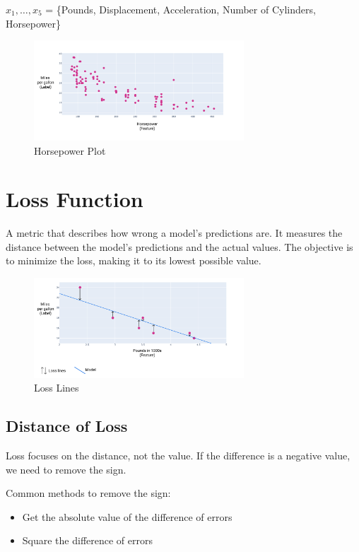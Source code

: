 \documentclass[a4paper,12pt]{article}
\begin{document}
\noindent $x_1, \dots, x_5$ = \{Pounds, Displacement, Acceleration, Number of Cylinders, Horsepower\}

\begin{figure}[h]
    \centering
    \includegraphics[width=0.7\textwidth]{../Images/horsepower-plot.png}
    \caption{Horsepower Plot}
    \label{fig:horsepower-plot}
\end{figure}

\section*{Loss Function}
A metric that describes how wrong a model's predictions are. It measures the distance between the model's predictions and the actual values. The objective is to minimize the loss, making it to its lowest possible value.

\begin{figure}[h]
    \centering
    \includegraphics[width=0.7\textwidth]{../Images/loss-lines.png}
    \caption{Loss Lines}
    \label{fig:loss-lines}
\end{figure}

\subsection*{Distance of Loss}
Loss focuses on the distance, not the value. If the difference is a negative value, we need to remove the sign.

\noindent Common methods to remove the sign: 
\begin{itemize}
    \item Get the absolute value of the difference of errors
    \item Square the difference of errors
\end{itemize}
\end{document}
